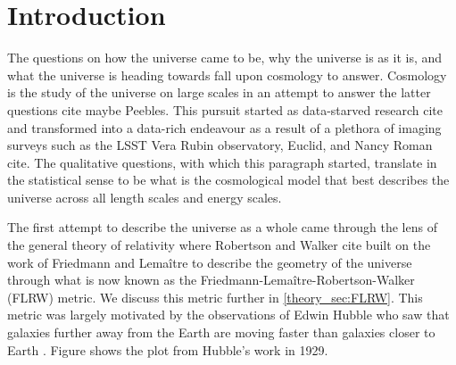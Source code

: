 
\chapter{Introduction}
\label{sec:intro}
The questions on how the universe came to be, why the universe is as it is, and what the universe is heading towards fall upon cosmology to answer. Cosmology is the study of the universe on large scales in an attempt to answer the latter questions {\color{green} cite maybe Peebles}. This pursuit started as data-starved research {\color{green} cite} and transformed into a data-rich endeavour as a result of a plethora of imaging surveys such as the LSST Vera Rubin observatory, Euclid, and Nancy Roman {\color{green} cite}. The qualitative questions, with which this paragraph started, translate in the statistical sense to be what is the cosmological model that best describes the universe across all length scales and energy scales.

The first attempt to describe the universe as a whole came through the lens of the general theory of relativity where Robertson and Walker  {\color{green} cite} built on the work of Friedmann and Lemaître to describe the geometry of the universe through what is now known as the Friedmann-Lemaître-Robertson-Walker (FLRW) metric. We discuss this metric further in \ref{theory_sec:FLRW}. This metric was largely motivated by the observations of Edwin Hubble who saw that galaxies further away from the Earth are moving faster than galaxies closer to Earth \cite{Hubble_1929}. Figure shows the plot from Hubble's work in 1929.

